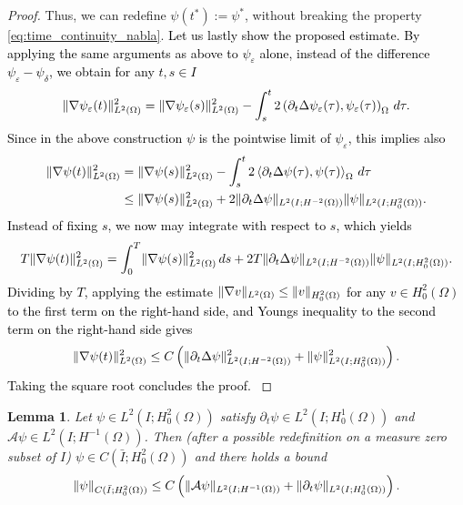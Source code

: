 \documentclass{m2an}
\newcommand{\1}{\mathds{1}}
\newcommand{\Om}{\Omega}
\newcommand{\revB}[1]{\textcolor{black}{#1}}
\DeclarePairedDelimiter{\norm}{\lVert}{\rVert}
\newcommand{\Oprod}[1]{\left(#1\right)_{\Omega}}
\newcommand{\Opair}[1]{\left\langle#1\right\rangle_{\Omega}}
\newtheorem{lemma}[theorem]{Lemma}
\theoremstyle{definition}
\begin{document}
\begin{proof}
    Thus, we can redefine $\psi(t^*) := \psi^*$, without breaking the property \eqref{eq:time_continuity_nabla}.
    \revB{Let us lastly show the proposed estimate. By applying the same arguments as above 
        to $\psi_\varepsilon$ alone, instead of the difference $\psi_\varepsilon - \psi_\delta$, we obtain
        for any $t,s \in I$
    \begin{equation*}
        \norm{\nabla \psi_\varepsilon(t)}_{L^2(\Om)}^2
        = \norm{\nabla \psi_\varepsilon(s)}_{L^2(\Om)}^2
        - \int_s^t 2\Oprod{\partial_t \Delta \psi_\varepsilon(\tau),\psi_\varepsilon(\tau)} \, d \tau.
    \end{equation*}
    Since in the above construction $\psi$ is the pointwise limit of $\psi_\varepsilon$, this implies also
    \begin{align*}
        \norm{\nabla \psi(t)}_{L^2(\Om)}^2
        & = \norm{\nabla \psi(s)}_{L^2(\Om)}^2
        - \int_s^t 2\Opair{\partial_t \Delta \psi(\tau),\psi(\tau)} \, d \tau\\
        & \le 
         \norm{\nabla \psi(s)}_{L^2(\Om)}^2
        + 2\norm{\partial_t \Delta \psi}_{L^2(I;H^{-2}(\Om))} \norm{\psi}_{L^2(I;H^2_0(\Om))}.
    \end{align*}
    Instead of fixing $s$, we now may integrate with respect to $s$, which yields 
    \begin{equation*}
        T \norm{\nabla \psi(t)}_{L^2(\Om)}^2
        = \int_0^T \norm{\nabla \psi(s)}_{L^2(\Om)}^2 \, d s
        + 2 T \norm{\partial_t \Delta \psi}_{L^2(I;H^{-2}(\Om))} \norm{\psi}_{L^2(I;H^2_0(\Om))}.
    \end{equation*}
    Dividing by $T$, applying the estimate $\norm{\nabla v}_{L^2(\Om)} \le \norm{v}_{H^2_0(\Om)}$ for any
    $v \in H^2_0(\Om)$ to the first term on the right-hand side,
    and Youngs inequality to the second term on the right-hand side gives
    \begin{equation*}
        \norm{\nabla \psi(t)}_{L^2(\Om)}^2 
        \le C\left( \norm{\partial_t \Delta \psi}_{L^2(I;H^{-2}(\Om))}^2 + \norm{\psi}_{L^2(I;H^2_0(\Om))}^2\right).
    \end{equation*}
    Taking the square root concludes the proof.
    }
\end{proof}
\begin{lemma}\label{lemm:H20_continuity}
    Let $\psi \in L^2(I;H^2_0(\Om))$ satisfy $\partial_t \psi \in L^2(I;H^{1}_0(\Om))$ 
    and $\mathcal A \psi \in L^2(I;H^{-1}(\Om))$.
    Then (after a possible redefinition on a measure zero subset of $I$)
    $\psi \in C(\bar I;H^2_0(\Om))$ and there holds a bound
    \begin{equation*}
        \norm{\psi}_{C(\bar I;H^2_0(\Om))} 
        \le C \left( \norm{\mathcal A \psi}_{L^2(I;H^{-1}(\Om))} 
        + \norm{\partial_t \psi}_{L^2(I;H^1_0(\Om))}\right).
    \end{equation*}
\end{lemma}
\end{document}

